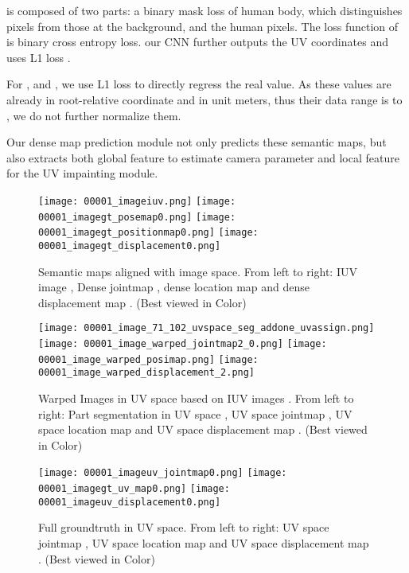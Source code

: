 \documentclass[10pt,twocolumn,letterpaper]{article}
\begin{document}
 is composed of two parts: a binary mask loss  of human body, which distinguishes pixels from those at the background, and the human pixels. The loss function of  is binary cross entropy loss.  our CNN further outputs the UV coordinates and uses L1 loss  . 



For ,   and  , we use L1 loss to directly regress the real value. As these values are already in root-relative coordinate and in unit meters, thus their data range is  to , we do not further normalize them.  

Our dense map prediction module not only predicts these semantic maps, but also extracts both global feature to estimate camera parameter and local feature for the UV impainting module.  


\begin{figure}
\centering
\texttt{[image: 00001\_imageiuv.png]}
\texttt{[image: 00001\_imagegt\_posemap0.png]}
\texttt{[image: 00001\_imagegt\_positionmap0.png]}
\texttt{[image: 00001\_imagegt\_displacement0.png]}
\caption{{Semantic maps aligned with image space. From left to right: IUV image , Dense jointmap , dense location map  and dense displacement map . (Best viewed in Color)}}
\label{fig:singlesample}
\end{figure}


\begin{figure}
\centering
\texttt{[image: 00001\_image\_71\_102\_uvspace\_seg\_addone\_uvassign.png]}
\texttt{[image: 00001\_image\_warped\_jointmap2\_0.png]}
\texttt{[image: 00001\_image\_warped\_posimap.png]}
\texttt{[image: 00001\_image\_warped\_displacement\_2.png]}
\caption{{Warped Images in UV space based on IUV images . From left to right: Part segmentation in UV space , UV space jointmap , UV space location map  and UV space displacement map . (Best viewed in Color) }}
\label{fig:singlesamplewarped}
\end{figure}

\begin{figure}
\centering
\texttt{[image: 00001\_imageuv\_jointmap0.png]}
\texttt{[image: 00001\_imagegt\_uv\_map0.png]}
\texttt{[image: 00001\_imageuv\_displacement0.png]}
\caption{{Full groundtruth in UV space. From left to right:  UV space jointmap , UV space location map  and UV space displacement map . (Best viewed in Color) }}
\label{fig:singlesamplewarpedfull}
\end{figure}
\end{document}
